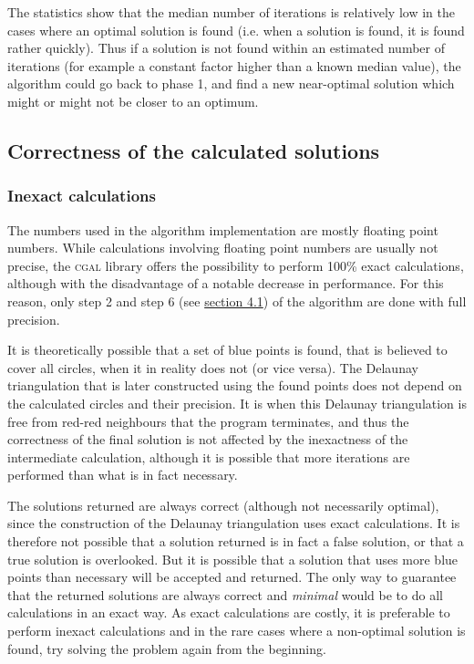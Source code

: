 \documentclass[a4paper,12pt]{article}
\begin{document}
The statistics show that the median number of iterations is relatively low in the cases where an optimal solution is found (i.e. when a solution is found, it is found rather quickly). Thus if a solution is not found within an estimated number of iterations (for example a constant factor higher than a known median value), the algorithm could go back to phase 1, and find a new near-optimal solution which might or might not be closer to an optimum.

\subsection{Correctness of the calculated solutions}
\subsubsection*{Inexact calculations}

The numbers used in the algorithm implementation are mostly floating point numbers. While calculations involving floating point numbers are usually not precise, the \textsc{cgal} library offers the possibility to perform 100\% exact calculations, although with the disadvantage of a notable decrease in performance. For this reason, only step 2 and step 6 (see \hyperref[ref:Algorithm]{section 4.1}) of the algorithm are done with full precision.

It is theoretically possible that a set of blue points is found, that is believed to cover all circles, when it in reality does not (or vice versa). The Delaunay triangulation that is later constructed using the found points does not depend on the calculated circles and their precision. It is when this Delaunay triangulation is free from red-red neighbours that the program terminates, and thus the correctness of the final solution is not affected by the inexactness of the intermediate calculation, although it is possible that more iterations are performed than what is in fact necessary.

The solutions returned are always correct (although not necessarily optimal), since the construction of the Delaunay triangulation uses exact calculations. It is therefore not possible that a solution returned is in fact a false solution, or that a true solution is overlooked. But it is possible that a solution that uses more blue points than necessary will be accepted and returned. The only way to guarantee that the returned solutions are always correct and \emph{minimal} would be to do all calculations in an exact way. As exact calculations are costly, it is preferable to perform inexact calculations and in the rare cases where a non-optimal solution is found, try solving the problem again from the beginning.
\end{document}
